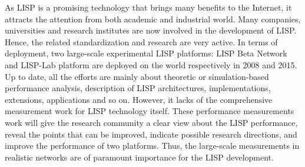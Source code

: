 
As LISP is a promising technology that brings many benefits to the Internet, it attracts the attention from both academic and industrial world. Many companies, universities and research institutes are now involved in the development of LISP. Hence, the related standardization and research are very active. In terms of deployment, two large-scale experimental LISP platforms: LISP Beta Network and LISP-Lab platform are deployed on the world respectively in 2008 and 2015. Up to date, all the efforts are mainly about theoretic or simulation-based performance analysis, description of LISP architectures, implementations, extensions, applications and so on. However, it lacks of the comprehensive measurement work for LISP technology itself. These performance measurements work will give the research community a clear view about the LISP performance, reveal the points that can be improved, indicate possible research directions, and improve the performance of two platforms. Thus, the large-scale measurements in realistic networks are of paramount importance for the LISP development.

